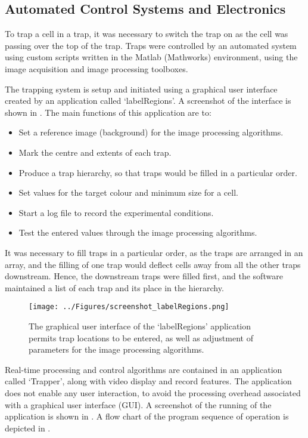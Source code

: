 \subsection{Automated Control Systems and Electronics}
\label{Section:Autotrapping_control_systems}
To trap a cell in a trap, it was necessary to switch the trap on as the cell was passing over the top of the trap. Traps were controlled by an automated system using custom scripts written in the Matlab (Mathworks) environment, using the image acquisition and image processing toolboxes. 

The trapping system is setup and initiated using a graphical user interface created by an application called `labelRegions'. A screenshot of the interface is shown in . The main functions of this application are to:

\begin{itemize}
	\item Set a reference image (background) for the image processing algorithms.
	\item Mark the centre and extents of each trap.
	\item Produce a trap hierarchy, so that traps would be filled in a particular order.
	\item Set values for the target colour and minimum size for a cell.
	\item Start a log file to record the experimental conditions.
	\item Test the entered values through the image processing algorithms.
\end{itemize}

It was necessary to fill traps in a particular order, as the traps are arranged in an array, and the filling of one trap would deflect cells away from all the other traps downstream. Hence, the downstream traps were filled first, and the software maintained a list of each trap and its place in the hierarchy.


\begin{figure}
	\centering
		\texttt{[image: ../Figures/screenshot\_labelRegions.png]}
	\caption[The graphical user interface of the `labelRegions' application.]{The graphical user interface of the `labelRegions' application permits trap locations to be entered, as well as adjustment of parameters for the image processing algorithms.}
	\label{fig:screenshot_labelRegions}
\end{figure}

Real-time processing and control algorithms are contained in an application called `Trapper', along with video display and record features. The application does not enable any user interaction, to avoid the processing overhead associated with a graphical user interface (GUI). A screenshot of the running of the application is shown in . A flow chart of the program sequence of operation is depicted in .

